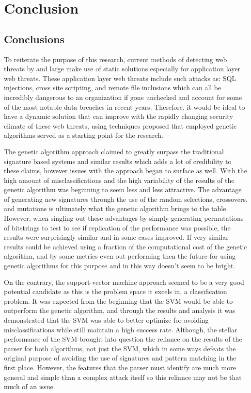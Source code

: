 \chapter{Conclusion}

\section{Conclusions}

To reiterate the purpose of this research, current methods of detecting web threats by and large make use of static solutions especially for application layer web threats.  These application layer web threats include such attacks as: SQL injections, cross site scripting, and remote file inclusions which can all be incredibly dangerous to an organization if gone unchecked and account for some of the most notable data breaches in recent years.  Therefore, it would be ideal to have a dynamic solution that can improve with the rapidly changing security climate of these web threats, using techniques proposed that employed genetic algorithms served as a starting point for the research.

The genetic algorithm approach claimed to greatly surpass the traditional signature based systems and similar results which adds a lot of credibility to these claims, however issues with the approach began to surface as well.  With the high amount of misclassifications and the high variability of the results of the genetic algorithm was beginning to seem less and less attractive.  The advantage of generating new signatures through the use of the random selections, crossovers, and mutations is ultimately what the genetic algorithm brings to the table.  However, when singling out these advantages by simply generating permutations of bitstrings to test to see if replication of the performance was possible, the results were surprisingly similar and in some cases improved.  If very similar results could be achieved using a fraction of the computational cost of the genetic algorithm, and by some metrics even out performing then the future for using genetic algorithms for this purpose and in this way doesn't seem to be bright.

On the contrary, the support-vector machine approach seemed to be a very good potential candidate as this is the problem space it excels in, a classification problem.  It was expected from the beginning that the SVM would be able to outperform the genetic algorithm, and through the results and analysis it was demonstrated that the SVM was able to better optimize for avoiding misclassifications while still maintain a high success rate.  Although, the stellar performance of the SVM brought into question the reliance on the results of the parser for both algorithms, not just the SVM, which in some ways defeats the original purpose of avoiding the use of signatures and pattern matching in the first place.  However, the features that the parser must identify are much more general and simple than a complex attack itself so this reliance may not be that much of an issue.

